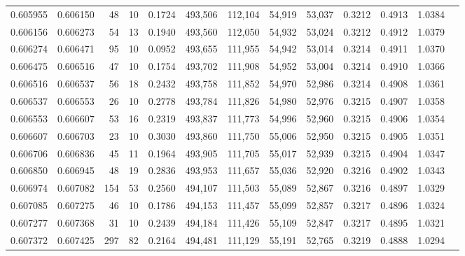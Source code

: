 \begin{tabular}{rrrrrrrrrrrrr}
0.605955 & 0.606150 &    48 &  10 &                                     0.1724 & 493,506 & 112,104 &  54,919 &  53,037 & 0.3212 & 0.4913 & 1.0384 \\
0.606156 & 0.606273 &    54 &  13 &                                     0.1940 & 493,560 & 112,050 &  54,932 &  53,024 & 0.3212 & 0.4912 & 1.0379 \\
0.606274 & 0.606471 &    95 &  10 &                                     0.0952 & 493,655 & 111,955 &  54,942 &  53,014 & 0.3214 & 0.4911 & 1.0370 \\
0.606475 & 0.606516 &    47 &  10 &                                     0.1754 & 493,702 & 111,908 &  54,952 &  53,004 & 0.3214 & 0.4910 & 1.0366 \\
0.606516 & 0.606537 &    56 &  18 &                                     0.2432 & 493,758 & 111,852 &  54,970 &  52,986 & 0.3214 & 0.4908 & 1.0361 \\
0.606537 & 0.606553 &    26 &  10 &                                     0.2778 & 493,784 & 111,826 &  54,980 &  52,976 & 0.3215 & 0.4907 & 1.0358 \\
0.606553 & 0.606607 &    53 &  16 &                                     0.2319 & 493,837 & 111,773 &  54,996 &  52,960 & 0.3215 & 0.4906 & 1.0354 \\
0.606607 & 0.606703 &    23 &  10 &                                     0.3030 & 493,860 & 111,750 &  55,006 &  52,950 & 0.3215 & 0.4905 & 1.0351 \\
0.606706 & 0.606836 &    45 &  11 &                                     0.1964 & 493,905 & 111,705 &  55,017 &  52,939 & 0.3215 & 0.4904 & 1.0347 \\
0.606850 & 0.606945 &    48 &  19 &                                     0.2836 & 493,953 & 111,657 &  55,036 &  52,920 & 0.3216 & 0.4902 & 1.0343 \\
0.606974 & 0.607082 &   154 &  53 &                                     0.2560 & 494,107 & 111,503 &  55,089 &  52,867 & 0.3216 & 0.4897 & 1.0329 \\
0.607085 & 0.607275 &    46 &  10 &                                     0.1786 & 494,153 & 111,457 &  55,099 &  52,857 & 0.3217 & 0.4896 & 1.0324 \\
0.607277 & 0.607368 &    31 &  10 &                                     0.2439 & 494,184 & 111,426 &  55,109 &  52,847 & 0.3217 & 0.4895 & 1.0321 \\
0.607372 & 0.607425 &   297 &  82 &                                     0.2164 & 494,481 & 111,129 &  55,191 &  52,765 & 0.3219 & 0.4888 & 1.0294 \\

\end{tabular}
